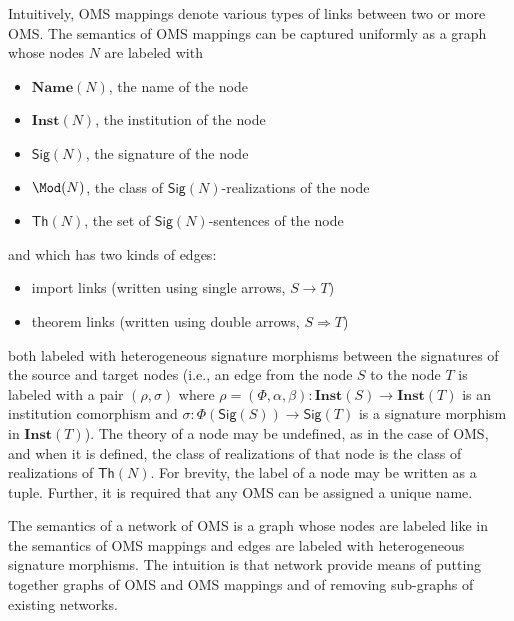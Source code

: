 \documentclass[10pt, a4paper]{isov2}
\newcommand{\Sig}{\mathsf{Sig}}
\renewcommand{\Th}{\mathsf{Th}}
\newcommand{\Inst}{\ensuremath{\mathbf{Inst}}}
\newcommand{\Name}{\ensuremath{\mathbf{Name}}}
\begin{document}
Intuitively, OMS mappings denote various types of links between two or more OMS.
The semantics of OMS mappings can be captured uniformly as a graph whose nodes $N$ are labeled with
\begin{itemize}
 \item $\Name(N)$, the name of the node
 \item $\Inst(N)$, the institution of the node
 \item $\Sig(N)$, the signature of the node
 \item $\Mod(N)$, the class of $\Sig(N)$-realizations of the node
 \item $\Th(N)$, the set of $\Sig(N)$-sentences of the node
\end{itemize}
and
which has two kinds of edges:
\begin{itemize}
  \item import links (written using single arrows, $S\rightarrow T$)
  \item theorem links (written using double arrows, $S\Rightarrow T$)
\end{itemize}
both labeled with
heterogeneous signature morphisms between the signatures of the source and target nodes
(i.e.,
an edge from the node $S$ to the node $T$ is labeled with a pair
$(\rho, \sigma)$ where $\rho=(\Phi,\alpha,\beta):\Inst(S)\to\Inst(T)$ is an institution comorphism and
$\sigma:\Phi(\Sig(S))\to\Sig(T)$ is a signature morphism in $\Inst(T)$).
The theory of a node  may be undefined, as in the case of OMS, and when it is defined,
the class of realizations of that node is the class of realizations of $\Th(N)$.
For brevity,  the label of a node may be written as a tuple. Further, it is required that  any OMS can be assigned a unique name.

The semantics of a network of OMS is a graph
whose nodes are labeled like in the semantics of OMS mappings and
edges are labeled with heterogeneous signature morphisms.
The intuition is that
network provide means of putting together graphs of OMS and OMS mappings
and of removing sub-graphs of existing networks.
\end{document}
